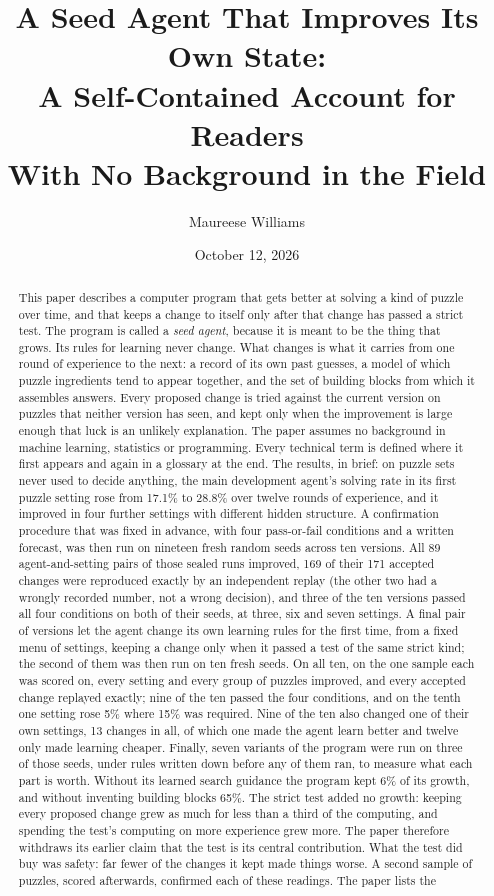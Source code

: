 \documentclass[11pt]{article}
\title{A Seed Agent That Improves Its Own State:\\ A Self-Contained Account for Readers\\ With No Background in the Field}
\author{Maureese Williams}
\date{October 12, 2026}
\begin{document}
\maketitle

\begin{abstract}
This paper describes a computer program that gets better at solving a kind of puzzle over time, and that keeps a change to itself only after that change has passed a strict test. The program is called a \emph{seed agent}, because it is meant to be the thing that grows. Its rules for learning never change. What changes is what it carries from one round of experience to the next: a record of its own past guesses, a model of which puzzle ingredients tend to appear together, and the set of building blocks from which it assembles answers. Every proposed change is tried against the current version on puzzles that neither version has seen, and kept only when the improvement is large enough that luck is an unlikely explanation. The paper assumes no background in machine learning, statistics or programming. Every technical term is defined where it first appears and again in a glossary at the end. The results, in brief: on puzzle sets never used to decide anything, the main development agent's solving rate in its first puzzle setting rose from 17.1\% to 28.8\% over twelve rounds of experience, and it improved in four further settings with different hidden structure. A confirmation procedure that was fixed in advance, with four pass-or-fail conditions and a written forecast, was then run on nineteen fresh random seeds across ten versions. All 89 agent-and-setting pairs of those sealed runs improved, 169 of their 171 accepted changes were reproduced exactly by an independent replay (the other two had a wrongly recorded number, not a wrong decision), and three of the ten versions passed all four conditions on both of their seeds, at three, six and seven settings. A final pair of versions let the agent change its own learning rules for the first time, from a fixed menu of settings, keeping a change only when it passed a test of the same strict kind; the second of them was then run on ten fresh seeds. On all ten, on the one sample each was scored on, every setting and every group of puzzles improved, and every accepted change replayed exactly; nine of the ten passed the four conditions, and on the tenth one setting rose 5\% where 15\% was required. Nine of the ten also changed one of their own settings, 13 changes in all, of which one made the agent learn better and twelve only made learning cheaper. Finally, seven variants of the program were run on three of those seeds, under rules written down before any of them ran, to measure what each part is worth. Without its learned search guidance the program kept 6\% of its growth, and without inventing building blocks 65\%. The strict test added no growth: keeping every proposed change grew as much for less than a third of the computing, and spending the test's computing on more experience grew more. The paper therefore withdraws its earlier claim that the test is its central contribution. What the test did buy was safety: far fewer of the changes it kept made things worse. A second sample of puzzles, scored afterwards, confirmed each of these readings. The paper lists the 
\end{abstract}
\end{document}
